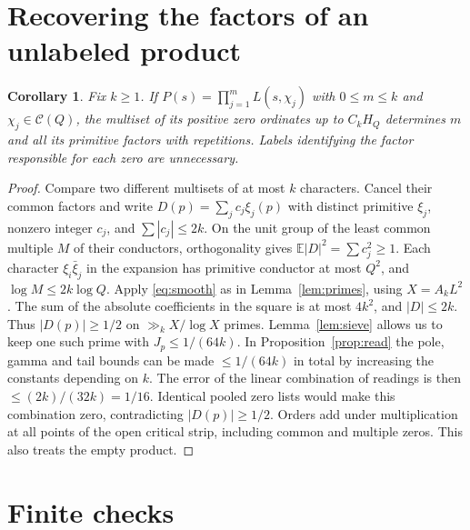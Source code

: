 \documentclass[11pt,letterpaper]{article}
\newtheorem{corollary}[theorem]{Corollary}
\begin{document}
\section{Recovering the factors of an unlabeled product}
\begin{corollary}\label{cor:packet}
Fix $k\ge1$. If $P(s)=\prod_{j=1}^m L(s,\chi_j)$ with $0\le m\le k$ and $\chi_j\in\mathcal C(Q)$, the multiset of its positive zero ordinates up to $C_k H_Q$ determines $m$ and all its primitive factors with repetitions. Labels identifying the factor responsible for each zero are unnecessary.
\end{corollary}
\begin{proof}
Compare two different multisets of at most $k$ characters. Cancel their common factors and write $D(p)=\sum_j c_j\xi_j(p)$ with distinct primitive $\xi_j$, nonzero integer $c_j$, and $\sum|c_j|\le2k$. On the unit group of the least common multiple $M$ of their conductors, orthogonality gives $\mathbb E|D|^2=\sum c_j^2\ge1$. Each character $\xi_i\bar\xi_j$ in the expansion has primitive conductor at most $Q^2$, and $\log M\le2k\log Q$. Apply \eqref{eq:smooth} as in Lemma~\ref{lem:primes}, using $X=A_k L^2$. The sum of the absolute coefficients in the square is at most $4k^2$, and $|D|\le2k$. Thus $|D(p)|\ge1/2$ on $\gg_k X/\log X$ primes. Lemma~\ref{lem:sieve} allows us to keep one such prime with $J_p\le1/(64k)$. In Proposition~\ref{prop:read} the pole, gamma and tail bounds can be made $\le1/(64k)$ in total by increasing the constants depending on $k$. The error of the linear combination of readings is then $\le (2k)/(32k)=1/16$. Identical pooled zero lists would make this combination zero, contradicting $|D(p)|\ge1/2$. Orders add under multiplication at all points of the open critical strip, including common and multiple zeros. This also treats the empty product.
\end{proof}

\section{Finite checks}
\end{document}
